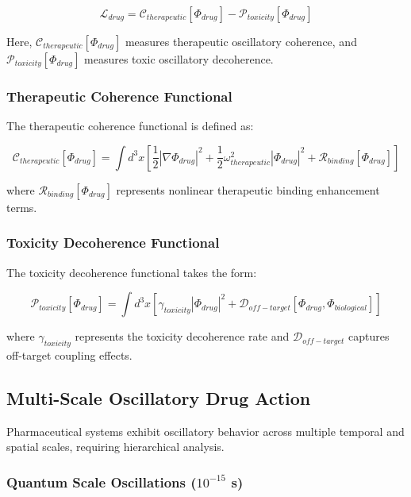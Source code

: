 \begin{equation}
\mathcal{L}_{drug} = \mathcal{C}_{therapeutic}[\Phi_{drug}] - \mathcal{P}_{toxicity}[\Phi_{drug}]
\end{equation}

Here, $\mathcal{C}_{therapeutic}[\Phi_{drug}]$ measures therapeutic oscillatory coherence, and $\mathcal{P}_{toxicity}[\Phi_{drug}]$ measures toxic oscillatory decoherence.

\subsubsection{Therapeutic Coherence Functional}

The therapeutic coherence functional is defined as:

\begin{equation}
\mathcal{C}_{therapeutic}[\Phi_{drug}] = \int d^3x \left[\frac{1}{2}|\nabla\Phi_{drug}|^2 + \frac{1}{2}\omega_{therapeutic}^2|\Phi_{drug}|^2 + \mathcal{R}_{binding}[\Phi_{drug}]\right]
\end{equation}

where $\mathcal{R}_{binding}[\Phi_{drug}]$ represents nonlinear therapeutic binding enhancement terms.

\subsubsection{Toxicity Decoherence Functional}

The toxicity decoherence functional takes the form:

\begin{equation}
\mathcal{P}_{toxicity}[\Phi_{drug}] = \int d^3x \left[\gamma_{toxicity}|\Phi_{drug}|^2 + \mathcal{D}_{off-target}[\Phi_{drug}, \Phi_{biological}]\right]
\end{equation}

where $\gamma_{toxicity}$ represents the toxicity decoherence rate and $\mathcal{D}_{off-target}$ captures off-target coupling effects.

\subsection{Multi-Scale Oscillatory Drug Action}

Pharmaceutical systems exhibit oscillatory behavior across multiple temporal and spatial scales, requiring hierarchical analysis.

\subsubsection{Quantum Scale Oscillations ($10^{-15}$ s)}

